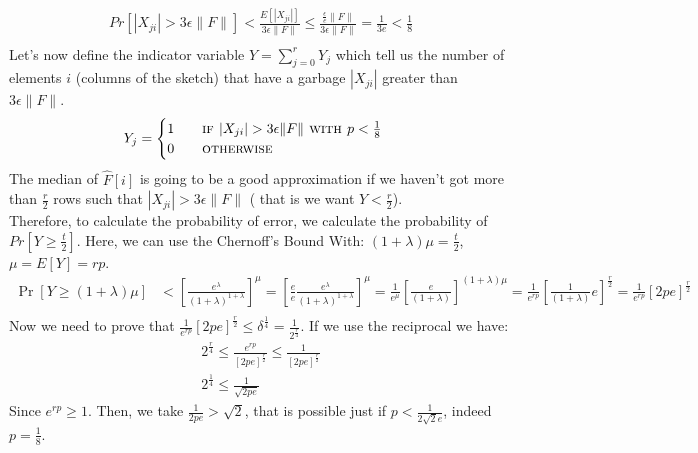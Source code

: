 \documentclass[a4paper]{article}
\begin{document}
\begin{align*}
 Pr[|X_{ji}|>   3\epsilon \|F\| ]< \frac{E[|X_{ji}|]}{3\epsilon \|F\|}\leq \frac{\frac{\epsilon}{e} \|F\|}{3\epsilon \|F\|}= \frac{1}{3e } < \frac{1}{8}\\
\end{align*}
Let's now define the indicator variable $Y=\sum_{j=0}^r Y_j$ which tell us the number of elements $i$ (columns of the sketch) that have a garbage $|X_{ji}|$ greater than $3\epsilon \|F\|$. 
\begin{equation}
Y_{j} =  
\begin{cases} 
1 \qquad \textsc{if } |X_{ji}|>   3\epsilon \|F\|\textsc{ with } p<\frac{1}{8}\\
0 \qquad \textsc{otherwise}
\end{cases}
\nonumber
\end{equation}
The median of $\hat{F}[i]$ is going to be a good approximation if we haven't  got more than $\frac{r}{2}$ rows such that $|X_{ji}|>   3\epsilon \|F\|$ ( that is we want $Y < \frac{r}{2}$). \\
Therefore, to calculate the probability of error, we calculate the probability of $Pr[ Y \geq \frac{t}{2}]$. Here, we can use the Chernoff’s Bound
With: $(1+\lambda )\mu =\frac{t}{2}$, $\mu = E[Y]=rp$.
\begin{align*}
\Pr[Y\geq (1+\lambda )\mu] &< \left[{\frac {e^{\lambda }}{(1+\lambda )^{1+\lambda }}}\right]^{\mu}=\left[{\frac{e}{e} \frac {e^{\lambda }}{(1+\lambda )^{1+\lambda }}}\right]^{\mu}=\frac{1}{e^{\mu}}\left[{\frac {e}{(1+\lambda )}}\right]^{(1+\lambda)\mu}=\frac{1}{e^{rp}}\left[{\frac {1}{(1+\lambda )}e}\right]^{\frac{r}{2}}=\frac{1}{e^{rp}}\left[{2pe}\right]^{\frac{r}{2}}\\
\end{align*}
Now we need to prove that $\frac{1}{e^{rp}}\left[{2pe}\right]^{\frac{r}{2}} \leq \delta^{\frac{1}{4}}=\frac{1}{2^{\frac{r}{4}}}$. If we use the reciprocal we have:
\begin{align*}
2^{\frac{r}{4}} \leq \frac{e^{rp}}{\left[{2pe}\right]^{\frac{r}{2}} }\leq \frac{1}{\left[{2pe}\right]^{\frac{r}{2}} }\\
2^{\frac{1}{4}} \leq \frac{1}{ \sqrt{2pe} } 
\end{align*} 
Since $e^{rp}\geq 1$. Then, we take $\frac{1}{ 2pe } > \sqrt{2} $, that is possible just if $p < \frac{1}{ 2 \sqrt{2}e }$, indeed $p=\frac{1}{8}$.
\end{document}
